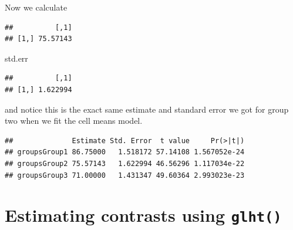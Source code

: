 \documentclass[]{book}
\newenvironment{Shaded}{\begin{snugshade}}{\end{snugshade}}
\newcommand{\KeywordTok}[1]{\textcolor[rgb]{0.13,0.29,0.53}{\textbf{{#1}}}}
\newcommand{\DecValTok}[1]{\textcolor[rgb]{0.00,0.00,0.81}{{#1}}}
\newcommand{\StringTok}[1]{\textcolor[rgb]{0.31,0.60,0.02}{{#1}}}
\newcommand{\CommentTok}[1]{\textcolor[rgb]{0.56,0.35,0.01}{\textit{{#1}}}}
\newcommand{\NormalTok}[1]{{#1}}
\theoremstyle{definition}
\theoremstyle{definition}
\theoremstyle{remark}
\begin{document}
Now we calculate

\begin{Shaded}
\end{Shaded}

\begin{verbatim}
##          [,1]
## [1,] 75.57143
\end{verbatim}

\begin{Shaded}
\begin{Highlighting}[]
\NormalTok{std.err}
\end{Highlighting}
\end{Shaded}

\begin{verbatim}
##          [,1]
## [1,] 1.622994
\end{verbatim}

and notice this is the exact same estimate and standard error we got for
group two when we fit the cell means model.

\begin{Shaded}
\end{Shaded}

\begin{verbatim}
##              Estimate Std. Error  t value     Pr(>|t|)
## groupsGroup1 86.75000   1.518172 57.14108 1.567052e-24
## groupsGroup2 75.57143   1.622994 46.56296 1.117034e-22
## groupsGroup3 71.00000   1.431347 49.60364 2.993023e-23
\end{verbatim}

\section{\texorpdfstring{Estimating contrasts using
\texttt{glht()}}{Estimating contrasts using glht()}}\label{estimating-contrasts-using-glht}
\end{document}
